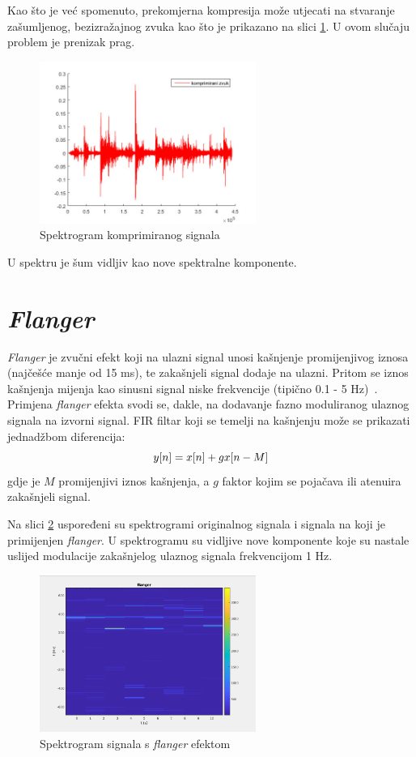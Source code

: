 \documentclass[conference]{IEEEtran}
\begin{document}
Kao što je već spomenuto, prekomjerna kompresija može utjecati na stvaranje zašumljenog, bezizražajnog
zvuka kao što je prikazano na slici \ref{komp_sum}. U ovom slučaju problem je prenizak prag.

\begin{figure}[H]
    \includegraphics[width=200pt]{slike/prenizak_prag.jpg}
    \centering
    \caption{Spektrogram komprimiranog signala}
    \label{komp_sum}
\end{figure}

U spektru je šum vidljiv kao nove spektralne komponente.

\section{\textit{Flanger}}

\textit{Flanger} je zvučni efekt koji na ulazni signal unosi kašnjenje promijenjivog iznosa (najčešće manje
od 15 ms), te zakašnjeli signal dodaje na ulazni. Pritom se iznos kašnjenja mijenja kao sinusni signal
niske frekvencije (tipično 0.1 - 5 Hz)~\cite{b1}. Primjena \textit{flanger} efekta svodi se, dakle, na
dodavanje fazno moduliranog ulaznog signala na izvorni signal. FIR filtar koji se temelji na kašnjenju može
se prikazati jednadžbom diferencija:
\begin{equation}
  y[n]=x[n]+g\*x[n-M]
  \label{flanger}
\end{equation}
gdje je $M$ promijenjivi iznos kašnjenja, a $g$ faktor kojim se pojačava ili atenuira zakašnjeli signal.

Na slici \ref{flang_spektar} uspoređeni su spektrogrami originalnog signala i signala na koji je
primijenjen \textit{flanger}. U spektrogramu su vidljive nove komponente koje su nastale uslijed modulacije
zakašnjelog ulaznog signala frekvencijom 1 Hz.

\begin{figure}[H]
    \includegraphics[width=200pt]{slike/flanger_spektar.png}
    \centering
    \caption{Spektrogram signala s \textit{flanger} efektom}
    \label{flang_spektar}
\end{figure}
\end{document}
